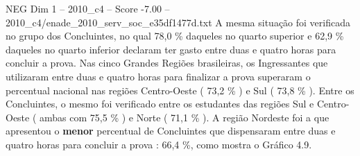 \begin{textsample}{NEG Dim 1 – 2010\_c4 – Score -7.00 – 2010\_c4/enade\_2010\_serv\_soc\_e35df1477d.txt}
A mesma situação foi verificada no grupo dos Concluintes, no qual 78,0 \% daqueles no quarto superior e 62,9 \% daqueles no quarto inferior declaram ter gasto entre duas e quatro horas para concluir a prova.
Nas cinco Grandes Regiões brasileiras, os Ingressantes que utilizaram entre duas e quatro horas para finalizar a prova superaram o percentual nacional nas regiões Centro-Oeste ( 73,2 \% ) e Sul ( 73,8 \% ).
Entre os Concluintes, o mesmo foi verificado entre os estudantes das regiões Sul e Centro-Oeste ( ambas com 75,5 \% ) e Norte ( 71,1 \% ).
A região Nordeste foi a que apresentou o \textbf{menor} percentual de Concluintes que dispensaram entre duas e quatro horas para concluir a prova : 66,4 \%, como mostra o Gráfico 4.9.

\end{textsample}

